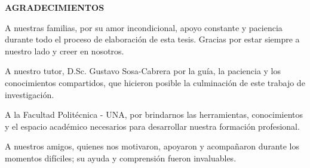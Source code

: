 \centerline{\textbf{\large AGRADECIMIENTOS}}

\vspace{0.5cm}

\justify
A nuestras familias, por su amor incondicional, apoyo constante y paciencia durante todo el proceso de elaboración de esta tesis. Gracias por estar siempre a nuestro lado y creer en nosotros.

\justify
A nuestro tutor, D.Sc. Gustavo Sosa-Cabrera por la guía, la paciencia y los conocimientos compartidos, que hicieron posible la culminación de este trabajo de investigación.

\justify
A la Facultad Politécnica - UNA, por brindarnos las herramientas, conocimientos y el espacio académico necesarios para desarrollar nuestra formación profesional.

\justify
A nuestros amigos, quienes nos motivaron, apoyaron y acompañaron durante los momentos difíciles; su ayuda y comprensión fueron invaluables.